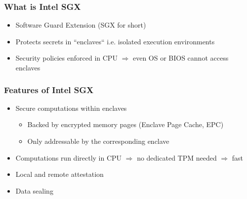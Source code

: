 \begin{frame}
    \frametitle{What is Intel SGX}
    \begin{itemize}
        \item Software Guard Extension (SGX for short)
        \item Protects secrets in ``enclaves`` i.e. isolated execution environments
        \item Security policies enforced in CPU $\Rightarrow$ even OS or BIOS cannot access enclaves
    \end{itemize}
\end{frame}

\begin{frame}
    \frametitle{Features of Intel SGX}
    \begin{itemize}
        \item Secure computations within enclaves
        \begin{itemize}
            \item Backed by encrypted memory pages (Enclave Page Cache, EPC)
            \item Only addressable by the corresponding enclave
        \end{itemize}
        \item Computations run directly in CPU $\Rightarrow$ no dedicated TPM needed \newline $\Rightarrow$ fast
        \item Local and remote attestation
        \item Data sealing
    \end{itemize}
    

\end{frame}